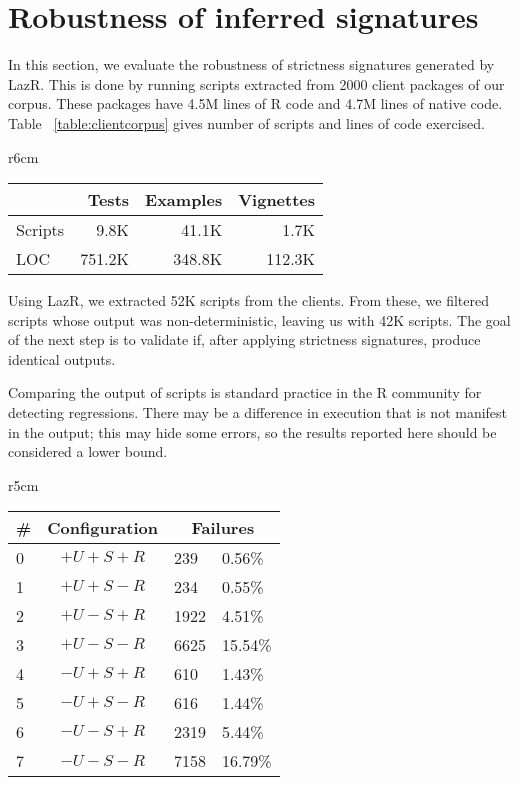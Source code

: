 \documentclass[review,nonacm,screen,acmsmall,anonymous=true]{acmart}
\newcommand{\lazr}{{\sf LazR}\xspace}
\begin{document}
\newpage
\section{Robustness of inferred signatures} \label{Evaluation:Robustness}

In this section, we evaluate the robustness of strictness signatures generated
by \lazr. This is done by running scripts extracted from 2000 client packages of
our corpus. These packages have 4.5M lines of R code and 4.7M lines of native
code. Table ~\ref{table:clientcorpus} gives number of scripts and lines of code
exercised.

\begin{wraptable}{r}{6cm}  \vspace{-3mm}  \small  \centering
  \caption{Client Corpus}\label{table:clientcorpus}  \vspace{-3mm}
  \begin{tabular}{lrrr}    \toprule
    &\bf Tests&\bf Examples&\bf Vignettes\\
    \midrule
    {Scripts} &9.8K&41.1K&1.7K\\
    \midrule
    {LOC} &751.2K&348.8K&112.3K\\    \bottomrule
  \end{tabular}
\end{wraptable}%

Using \lazr, we extracted 52K scripts from the clients. From these, we filtered
scripts whose output was non-deterministic, leaving us with 42K scripts. The
goal of the next step is to validate if, after applying strictness signatures,
produce identical outputs.

Comparing the output of scripts is standard practice in the R community for
detecting regressions. There may be a difference in execution that is not
manifest in the output; this may hide some errors, so the results reported here
should be considered a lower bound.

\begin{wraptable}{r}{5cm}
  \small
  \caption{Strictness Failure} \label{table:strictfail}
  \centering
  \begin{tabular}{lc|ll}
    \toprule
    \#&\textbf{Configuration}&\multicolumn{2}{c}{\textbf{Failures}}\\
    \midrule
    0&$+U+S+R$&239&0.56\%\\
    1&$+U+S-R$&234&0.55\%\\
    2&$+U-S+R$&1922&4.51\%\\
    3&$+U-S-R$&6625&15.54\%\\
    4&$-U+S+R$&610&1.43\%\\
    5&$-U+S-R$&616&1.44\%\\
    6&$-U-S+R$&2319&5.44\%\\
    7&$-U-S-R$&7158&16.79\%\\
    \bottomrule
  \end{tabular}
\end{wraptable}
\end{document}
